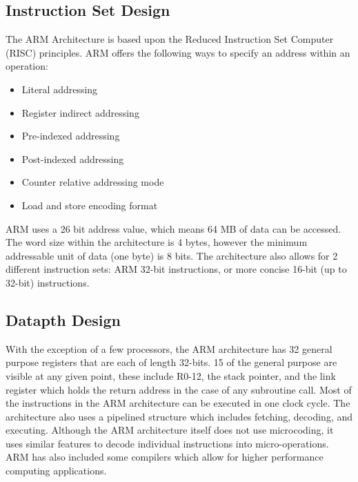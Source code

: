 \documentclass[draftclsnofoot, onecolumn, 10pt, compsoc]{IEEEtran}
\begin{document}
        \subsection{Instruction Set Design}
            The ARM Architecture is based upon the Reduced Instruction Set Computer (RISC) principles. ARM offers the following ways to specify an address within an operation:
            \begin{itemize}
                \item Literal addressing
                \item Register indirect addressing
                \item Pre-indexed addressing
                \item Post-indexed addressing
                \item Counter relative addressing mode
                \item Load and store encoding format
            \end{itemize}
            ARM uses a 26 bit address value, which means 64 MB of data can be accessed. 
            The word size within the architecture is 4 bytes, however the minimum addressable unit of data (one byte) is 8 bits. The architecture also allows for 2 different instruction sets: ARM 32-bit instructions, or more concise 16-bit (up to 32-bit) instructions. 
            ~\cite{ARM:Inside}
            ~\cite{ARM:Addressing}
            \cite{ARM:Thumb}

        \subsection{Datapth Design}
            With the exception of a few processors, the ARM architecture has 32 general purpose registers that are each of length 32-bits. 15 of the general purpose are visible at any given point, these include R0-12, the stack pointer, and the link register which holds the return address in the case of any subroutine call. Most of the instructions in the ARM architecture can be executed in one clock cycle. The architecture also uses a pipelined structure which includes fetching, decoding, and executing. Although the ARM architecture itself does not use microcoding, it uses similar features to decode individual instructions into micro-operations. ARM has also included some compilers which allow for higher performance computing applications. 
            ~\cite{ARM:Registers}
            ~\cite{ARM:Data}
            ~\cite{ARM:Instructions}
            ~\cite{ARM:HPC}
           
\end{document}
